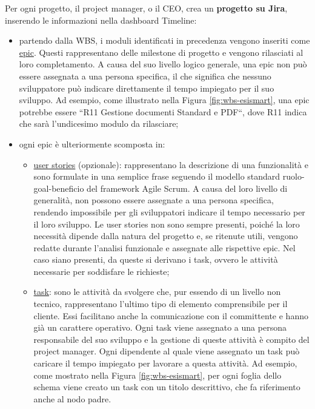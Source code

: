         Per ogni progetto, il project manager, o il CEO, crea un \textbf{progetto su Jira}, inserendo le informazioni nella dashboard Timeline:
        \begin{itemize}
            \item partendo dalla \ac{WBS}, i moduli identificati in precedenza vengono inseriti come \underline{epic}. Questi rappresentano
            delle milestone di progetto e vengono rilasciati al loro completamento. A causa del suo livello logico generale, una epic non può essere
            assegnata a una persona specifica, il che significa che nessuno sviluppatore può indicare direttamente il tempo impiegato per il suo sviluppo. Ad
            esempio, come illustrato nella Figura \ref{fig:wbs-esismart}, una epic potrebbe essere “R11 Gestione documenti Standard e PDF“, dove R11 indica che sarà l’undicesimo modulo da rilasciare;

            \item ogni epic è ulteriormente scomposta in:
                \begin{itemize}
                    \item \underline{user stories} (opzionale): rappresentano la descrizione di una funzionalità e sono formulate in una semplice frase seguendo
                    il modello standard ruolo-goal-beneficio del framework Agile Scrum. A causa del loro livello di generalità, non possono essere
                    assegnate a una persona specifica, rendendo impossibile per gli sviluppatori indicare il tempo necessario per il loro sviluppo. Le
                    user stories non sono sempre presenti, poiché la loro necessità dipende dalla natura del progetto e, se ritenute utili, vengono
                    redatte durante l’analisi funzionale e assegnate alle rispettive epic. Nel caso siano presenti, da queste si derivano i task, ovvero le
                    attività necessarie per soddisfare le richieste;

                    \item \underline{task}: sono le attività da svolgere che, pur essendo di un livello non tecnico, rappresentano l'ultimo tipo di elemento
                    comprensibile per il cliente. Essi facilitano anche la comunicazione con il committente e hanno già un carattere operativo. Ogni task
                    viene assegnato a una persona responsabile del suo sviluppo e la gestione di queste attività è compito del project manager. Ogni
                    dipendente al quale viene assegnato un task può caricare il tempo impiegato per lavorare a questa attività. Ad esempio, come mostrato
                    nella Figura \ref{fig:wbs-esismart}, per ogni foglia dello schema viene creato un task con un titolo descrittivo, che fa riferimento anche al nodo padre.
                \end{itemize}
            

\end{itemize}
